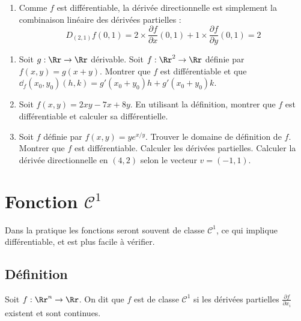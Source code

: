 \documentclass[12pt, class=report,crop=false]{standalone}
\begin{document}
{\begin{exemple}
\begin{enumerate}
  \item Comme $f$ est différentiable, la dérivée directionnelle est simplement la combinaison linéaire des dérivées partielles :
  $$D_{(2,1)} f(0,1) = 2\times \frac{\partial f}{\partial x}(0,1)+1\times
  \frac{\partial f}{\partial y}(0,1) = 2$$
\end{enumerate} 
  
\end{exemple}



\begin{miniexercices}
\sauteligne
\begin{enumerate}
  \item Soit $g : \Rr \to \Rr$ dérivable. Soit $f : \Rr^2 \to \Rr$ définie par $f(x,y)= g(x+y)$. Montrer que $f$ est différentiable et que
  $\dd_f (x_0,y_0)(h,k) = g'(x_0+y_0)h + g'(x_0+y_0)k$.
  
  \item Soit $f(x,y) = 2xy-7x+8y$. En utilisant la définition, montrer que $f$ est différentiable et calculer sa différentielle.
  
  \item Soit $f$ définie par $f(x,y) = ye^{x/y}$. Trouver le domaine de définition de $f$. Montrer que $f$ est différentiable. Calculer les dérivées partielles. Calculer la dérivée directionnelle en $(4,2)$ selon le vecteur $v = (-1,1)$.
  
\end{enumerate}
\end{miniexercices}





\section{Fonction $\mathcal{C}^1$}

Dans la pratique les fonctions seront souvent de classe $\mathcal{C}^1$, ce qui implique différentiable, et est plus facile à vérifier. 


\subsection{Définition}

\begin{definition}
Soit $f: \Rr^n \to \Rr$. On dit que $f$ est de classe $\mathcal{C}^1$ si les dérivées partielles $\frac{\partial f}{\partial x_i}$
existent et sont continues.
\end{definition}

}
\end{document}
